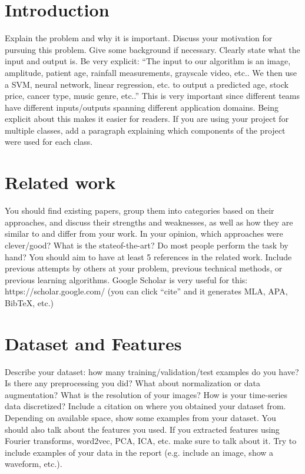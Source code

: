 \documentclass{article}
\begin{document}
\section{Introduction}	
Explain the problem and why it is important. Discuss your motivation for pursuing this
problem. Give some background if necessary. Clearly state what the input and output
is. Be very explicit: “The input to our algorithm is an {image, amplitude, patient age,
rainfall measurements, grayscale video, etc.}. We then use a {SVM, neural network, linear
regression, etc.} to output a predicted {age, stock price, cancer type, music genre, etc.}.”
This is very important since different teams have different inputs/outputs spanning different
application domains. Being explicit about this makes it easier for readers. If you are using
your project for multiple classes, add a paragraph explaining which components of the
project were used for each class.

\section{Related work}
You should find existing papers, group them into categories based on their approaches,
and discuss their strengths and weaknesses, as well as how they are similar to and differ
from your work. In your opinion, which approaches were clever/good? What is the stateof-the-art?
Do most people perform the task by hand? You should aim to have at least
5 references in the related work. Include previous attempts by others at your problem,
previous technical methods, or previous learning algorithms. Google Scholar is very useful
for this: https://scholar.google.com/ (you can click “cite” and it generates MLA, APA,
BibTeX, etc.)

\section{Dataset and Features}
Describe your dataset: how many training/validation/test examples do you have? Is there
any preprocessing you did? What about normalization or data augmentation? What is the
resolution of your images? How is your time-series data discretized? Include a citation on
where you obtained your dataset from. Depending on available space, show some examples
from your dataset. You should also talk about the features you used. If you extracted
features using Fourier transforms, word2vec, PCA,
ICA, etc. make sure to talk about it. Try to include examples of your data in the report
(e.g. include an image, show a waveform, etc.).
\end{document}
